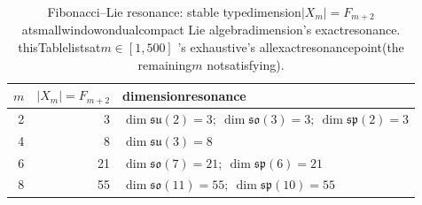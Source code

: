 \begin{table}[H]
\centering
\scriptsize
\setlength{\tabcolsep}{6pt}
\caption{Fibonacci--Lie resonance: stable typedimension$|X_m|=F_{m+2}$ atsmallwindowondualcompact Lie algebradimension's exactresonance. thisTablelistsat$m\in[1,500]$ 's exhaustive's allexactresonancepoint(the remaining$m$ notsatisfying).}
\label{tab:fibonacci_lie_resonance_ladder}
\begin{tabular}{r r l}
\toprule
$m$ & $|X_m|=F_{m+2}$ & dimensionresonance\\
\midrule
2 & 3 & $\dim\mathfrak{su}(2)=3;\ \dim\mathfrak{so}(3)=3;\ \dim\mathfrak{sp}(2)=3$\\
4 & 8 & $\dim\mathfrak{su}(3)=8$\\
6 & 21 & $\dim\mathfrak{so}(7)=21;\ \dim\mathfrak{sp}(6)=21$\\
8 & 55 & $\dim\mathfrak{so}(11)=55;\ \dim\mathfrak{sp}(10)=55$\\
\bottomrule
\end{tabular}
\end{table}
